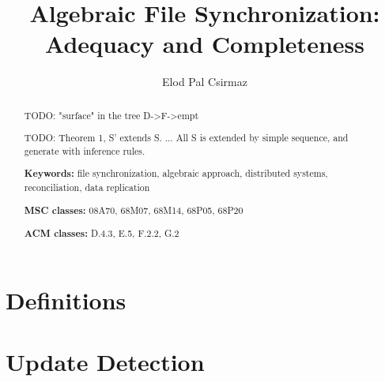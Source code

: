 \documentclass[12pt]{article}
\title{Algebraic File Synchronization: Adequacy and Completeness}
\author{Elod Pal Csirmaz\\
\texttt{\rot{\rot{maz.}{csir}{ep}com}{@}{elod}}}
\date{}
\begin{document}
\maketitle
\begin{abstract}

TODO: "surface" in the tree D->F->empt

TODO: Theorem 1, S' extends S. ... All S is extended by simple sequence, and generate with inference rules.



\myskip
{\bf Keywords:} %
file synchronization,
algebraic approach,
distributed systems,
reconciliation,
data replication

\myskip
{\bf MSC classes:} %
08A70, %
68M07, %
68M14, %
68P05, %
68P20 %

\myskip
{\bf ACM classes:} %
D.4.3, %
E.5, %
F.2.2, %
G.2 %

\end{abstract}



\section{Definitions}







\section{Update Detection}






\end{document}
